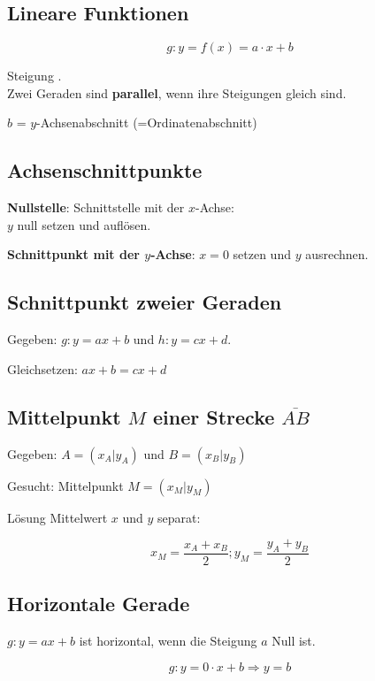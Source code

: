 \begin{multicols}{2}


\hrulefill
\section*{Lineare Funktionen}

$$g: y = f(x) = a\cdot{}x + b$$

Steigung .\\
Zwei Geraden sind \textbf{parallel}, wenn ihre Steigungen gleich sind.

$b$ = $y$-Achsenabschnitt (=Ordinatenabschnitt)

\subsection*{Achsenschnittpunkte}

\textbf{Nullstelle}: Schnittstelle mit der $x$-Achse:\\ $y$ null setzen und auf\/lösen.

\textbf{Schnittpunkt mit der $y$-Achse}: 
$x=0$ setzen und $y$ ausrechnen.


\subsection*{Schnittpunkt zweier Geraden}
Gegeben: $g: y=ax+b$ und $h: y=cx+d$.

Gleichsetzen: $ax+b = cx+d$


\subsection*{Mittelpunkt $M$ einer Strecke $\overline{AB}$}
Gegeben: $A=(x_A|y_A)$ und $B=(x_B|y_B)$

Gesucht: Mittelpunkt $M=(x_M|y_M)$

Lösung Mittelwert $x$ und $y$ separat:

$$x_M = \frac{x_A+x_B}2; y_M=\frac{y_A+y_B}2$$

\subsection*{Horizontale Gerade}

$g: y=ax+b$ ist horizontal, wenn die Steigung $a$ Null ist.

$$g:  y=0\cdot{}x+b \Rightarrow y=b$$


\end{multicols}
